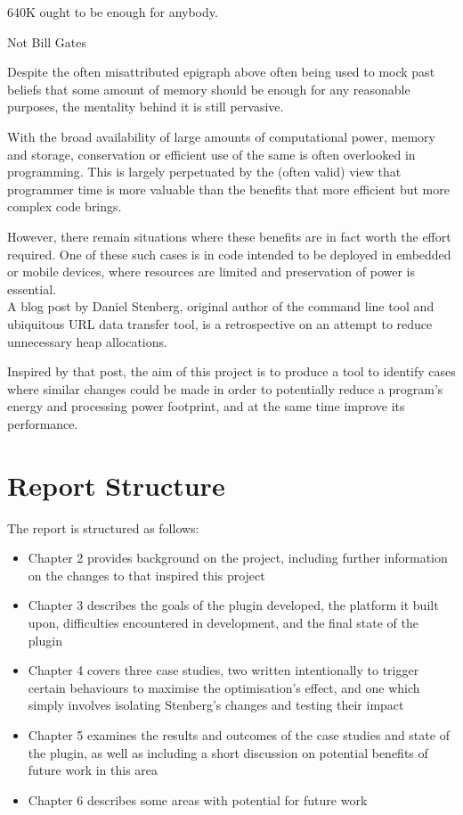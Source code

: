 \epigraph{640K ought to be enough for anybody.}{Not Bill Gates}

Despite the often misattributed epigraph above often being used to mock past beliefs that some amount of memory should be enough for any reasonable purposes, the mentality behind it is still pervasive.

With the broad availability of large amounts of computational power, memory and storage, conservation or efficient use of the same is often overlooked in programming. This is largely perpetuated by the (often valid) view that programmer time is more valuable than the benefits that more efficient but more complex code brings.

However, there remain situations where these benefits are in fact worth the effort required. One of these such cases is in code intended to be deployed in embedded or mobile devices, where resources are limited and preservation of power is essential. \\
A blog post \cite{curlmalloc} by Daniel Stenberg, original author of the  command line tool and ubiquitous URL data transfer tool, is a retrospective on an attempt to reduce unnecessary heap allocations.

Inspired by that post, the aim of this project is to produce a tool to identify cases where similar changes could be made in order to potentially reduce a program's energy and processing power footprint, and at the same time improve its performance.

\section{Report Structure}

The report is structured as follows:

\begin{itemize}
	\item{Chapter 2 provides background on the project, including further information on the changes to  that inspired this project}
	\item{Chapter 3 describes the goals of the plugin developed, the platform it built upon, difficulties encountered in development, and the final state of the plugin}
	\item{Chapter 4 covers three case studies, two written intentionally to trigger certain behaviours to maximise the optimisation's effect, and one which simply involves isolating Stenberg's changes and testing their impact}
	\item{Chapter 5 examines the results and outcomes of the case studies and state of the plugin, as well as including a short discussion on potential benefits of future work in this area}
	\item{Chapter 6 describes some areas with potential for future work}
\end{itemize}
